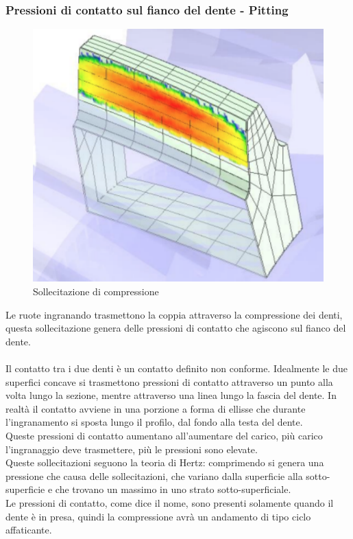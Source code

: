 \subsubsection{Pressioni di contatto sul fianco del dente - Pitting}
\begin{figure}[h]
    \centering
    \includegraphics[scale=0.3]{Immagini/Pitting.png}
    \caption{Sollecitazione di compressione}
    \label{fig:Pitting}
\end{figure}
Le ruote ingranando trasmettono la coppia attraverso la compressione dei denti, questa sollecitazione genera delle pressioni di contatto che agiscono sul fianco del dente.\\
\\
Il contatto tra i due denti è un contatto definito non conforme. Idealmente le due superfici concave  si trasmettono pressioni di contatto attraverso un punto alla volta lungo la sezione, mentre attraverso una linea lungo la fascia del dente. In realtà il contatto avviene in una porzione a forma di ellisse
che durante l’ingranamento si sposta lungo il profilo, dal fondo alla testa del dente.\\
Queste pressioni di contatto aumentano all’aumentare del carico, più carico l'ingranaggio deve trasmettere, più le pressioni sono elevate.\\
Queste sollecitazioni seguono la teoria di Hertz: comprimendo si genera una pressione che causa delle sollecitazioni, che variano dalla superficie alla sotto-superficie e che trovano un massimo in uno strato sotto-superficiale.\\
Le pressioni di contatto, come dice il nome, sono presenti solamente quando il dente è in presa, quindi la compressione avrà un andamento di tipo ciclo affaticante. 
